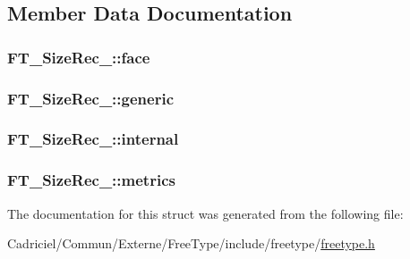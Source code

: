 \subsection{Member Data Documentation}
\hypertarget{struct_f_t___size_rec___a21b54fb07feaba8be23321054da98f5f}{
\subsubsection[{face}]{ F\-T\-\_\-\-Size\-Rec\-\_\-\-::face}}\label{struct_f_t___size_rec___a21b54fb07feaba8be23321054da98f5f}
\hypertarget{struct_f_t___size_rec___aa24520b093a9b4ba9ff388bfe7b9491d}{
\subsubsection[{generic}]{ F\-T\-\_\-\-Size\-Rec\-\_\-\-::generic}}\label{struct_f_t___size_rec___aa24520b093a9b4ba9ff388bfe7b9491d}
\hypertarget{struct_f_t___size_rec___a236c47ea3138e485c29b0d7baa5cf3b6}{
\subsubsection[{internal}]{ F\-T\-\_\-\-Size\-Rec\-\_\-\-::internal}}\label{struct_f_t___size_rec___a236c47ea3138e485c29b0d7baa5cf3b6}
\hypertarget{struct_f_t___size_rec___a29a6b518d09f6cf1714d9aed01eddc01}{
\subsubsection[{metrics}]{ F\-T\-\_\-\-Size\-Rec\-\_\-\-::metrics}}\label{struct_f_t___size_rec___a29a6b518d09f6cf1714d9aed01eddc01}


The documentation for this struct was generated from the following file\-:\begin{DoxyCompactItemize}
\item 
Cadriciel/\-Commun/\-Externe/\-Free\-Type/include/freetype/\hyperlink{freetype_8h}{freetype.\-h}\end{DoxyCompactItemize}
